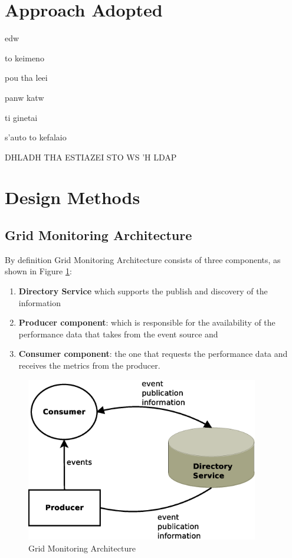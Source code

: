 \section{Approach Adopted}

edw

to keimeno

pou tha leei

panw katw

ti ginetai

s'auto to kefalaio

DHLADH THA ESTIAZEI STO WS 'H LDAP



\section{Design Methods}

\subsection{Grid Monitoring Architecture}

By definition \cite{Taylor2006} Grid Monitoring Architecture consists of three components, as shown in Figure \ref{figure:gma}:

\begin{enumerate}
\item {\bf Directory Service} which supports the publish and discovery of the information
\item {\bf Producer component}: which is responsible for the availability of the performance data that takes from the event source and
\item {\bf Consumer component}: the one that requests the performance data and receives the metrics from the producer.
\end{enumerate}

\begin{figure}[htb]
\centering
 \includegraphics[width=4in]{images/gma.eps}
\caption{Grid Monitoring Architecture}
\label{figure:gma}
\end{figure}

